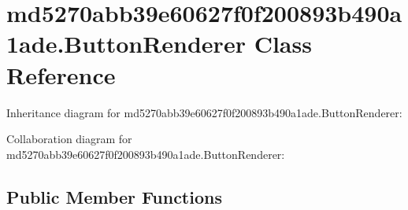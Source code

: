 \hypertarget{classmd5270abb39e60627f0f200893b490a1ade_1_1_button_renderer}{}\section{md5270abb39e60627f0f200893b490a1ade.\+Button\+Renderer Class Reference}
\label{classmd5270abb39e60627f0f200893b490a1ade_1_1_button_renderer}


Inheritance diagram for md5270abb39e60627f0f200893b490a1ade.\+Button\+Renderer\+:


Collaboration diagram for md5270abb39e60627f0f200893b490a1ade.\+Button\+Renderer\+:
\subsection*{Public Member Functions}
